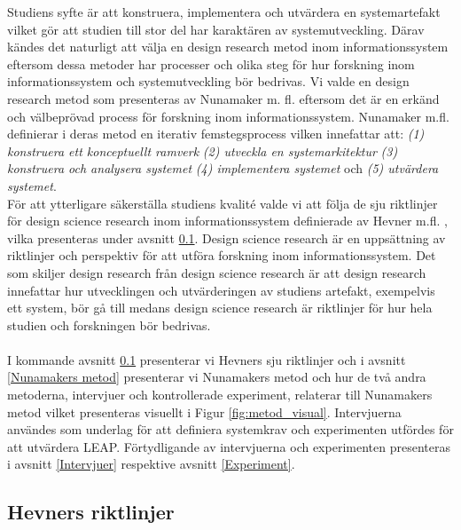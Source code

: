 \documentclass[a4paper,11pt]{article}
\begin{document}
{Studiens syfte är att konstruera, implementera och utvärdera en systemartefakt vilket gör att studien till stor del har karaktären av systemutveckling. Därav kändes det naturligt att välja en design research metod inom informationssystem eftersom dessa metoder har processer och olika steg för hur forskning inom informationssystem och systemutveckling bör bedrivas. Vi valde en design research metod som presenteras av Nunamaker m. fl. \cite{nunamaker} eftersom det är en erkänd och välbeprövad process för forskning inom informationssystem. Nunamaker m.fl. definierar i deras metod en iterativ femstegsprocess vilken innefattar att: \textit{(1) konstruera ett konceptuellt ramverk} \textit{(2) utveckla en systemarkitektur} \textit{(3) konstruera och analysera systemet} \textit{(4) implementera systemet} och \textit{(5) utvärdera systemet}.
\\
För att ytterligare säkerställa studiens kvalité valde vi att följa de sju riktlinjer för design science research inom informationssystem definierade av Hevner m.fl. \cite{hevner}, vilka presenteras under avsnitt \ref{hevner}. Design science research är en uppsättning av riktlinjer och perspektiv för att utföra forskning inom informationssystem. Det som skiljer design research från design science research är att design research innefattar hur utvecklingen och utvärderingen av studiens artefakt, exempelvis ett system, bör gå till medans design science research är riktlinjer för hur hela studien och forskningen bör bedrivas.
\\
\\
I kommande avsnitt \ref{hevner} presenterar vi Hevners sju riktlinjer och i avsnitt \ref{Nunamakers metod} presenterar vi Nunamakers metod och hur de två andra metoderna, intervjuer och kontrollerade experiment, relaterar till Nunamakers metod vilket presenteras visuellt i Figur \ref{fig:metod_visual}. Intervjuerna användes som underlag för att definiera systemkrav och experimenten utfördes för att utvärdera LEAP. Förtydligande av intervjuerna och experimenten presenteras i avsnitt \ref{Intervjuer} respektive avsnitt \ref{Experiment}.

\subsection{Hevners riktlinjer} \label{hevner}

}
\end{document}
